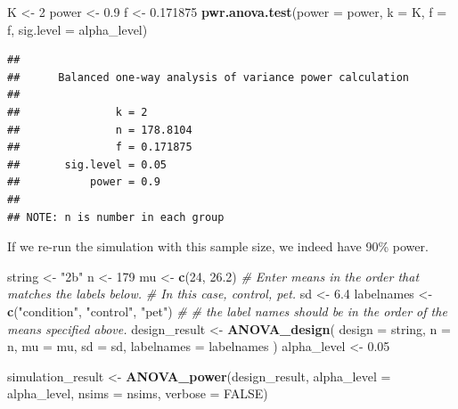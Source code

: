 \documentclass[
]{book}
\newenvironment{Shaded}{\begin{snugshade}}{\end{snugshade}}
\newcommand{\CommentTok}[1]{\textcolor[rgb]{0.56,0.35,0.01}{\textit{#1}}}
\newcommand{\DataTypeTok}[1]{\textcolor[rgb]{0.13,0.29,0.53}{#1}}
\newcommand{\DecValTok}[1]{\textcolor[rgb]{0.00,0.00,0.81}{#1}}
\newcommand{\FloatTok}[1]{\textcolor[rgb]{0.00,0.00,0.81}{#1}}
\newcommand{\KeywordTok}[1]{\textcolor[rgb]{0.13,0.29,0.53}{\textbf{#1}}}
\newcommand{\NormalTok}[1]{#1}
\newcommand{\OtherTok}[1]{\textcolor[rgb]{0.56,0.35,0.01}{#1}}
\newcommand{\StringTok}[1]{\textcolor[rgb]{0.31,0.60,0.02}{#1}}
\begin{document}
\begin{Shaded}
\begin{Highlighting}[]
\NormalTok{K <-}\StringTok{ }\DecValTok{2}
\NormalTok{power <-}\StringTok{ }\FloatTok{0.9}
\NormalTok{f <-}\StringTok{ }\FloatTok{0.171875}
\KeywordTok{pwr.anova.test}\NormalTok{(}\DataTypeTok{power =}\NormalTok{ power,}
               \DataTypeTok{k =}\NormalTok{ K,}
               \DataTypeTok{f =}\NormalTok{ f,}
               \DataTypeTok{sig.level =}\NormalTok{ alpha_level)}
\end{Highlighting}
\end{Shaded}

\begin{verbatim}
## 
##      Balanced one-way analysis of variance power calculation 
## 
##               k = 2
##               n = 178.8104
##               f = 0.171875
##       sig.level = 0.05
##           power = 0.9
## 
## NOTE: n is number in each group
\end{verbatim}

If we re-run the simulation with this sample size, we indeed have 90\% power.

\begin{Shaded}
\begin{Highlighting}[]
\NormalTok{string <-}\StringTok{ "2b"}
\NormalTok{n <-}\StringTok{ }\DecValTok{179}
\NormalTok{mu <-}\StringTok{ }\KeywordTok{c}\NormalTok{(}\DecValTok{24}\NormalTok{, }\FloatTok{26.2}\NormalTok{)}
\CommentTok{# Enter means in the order that matches the labels below.}
\CommentTok{# In this case, control, pet.}
\NormalTok{sd <-}\StringTok{ }\FloatTok{6.4}
\NormalTok{labelnames <-}\StringTok{ }\KeywordTok{c}\NormalTok{(}\StringTok{"condition"}\NormalTok{, }\StringTok{"control"}\NormalTok{, }\StringTok{"pet"}\NormalTok{) }\CommentTok{#}
\CommentTok{# the label names should be in the order of the means specified above.}
\NormalTok{design_result <-}\StringTok{ }\KeywordTok{ANOVA_design}\NormalTok{(}
\DataTypeTok{design =}\NormalTok{ string,}
\DataTypeTok{n =}\NormalTok{ n,}
\DataTypeTok{mu =}\NormalTok{ mu,}
\DataTypeTok{sd =}\NormalTok{ sd,}
\DataTypeTok{labelnames =}\NormalTok{ labelnames}
\NormalTok{)}
\NormalTok{alpha_level <-}\StringTok{ }\FloatTok{0.05}
\end{Highlighting}
\end{Shaded}

\begin{Shaded}
\begin{Highlighting}[]
\NormalTok{simulation_result <-}\StringTok{ }\KeywordTok{ANOVA_power}\NormalTok{(design_result, }
                                 \DataTypeTok{alpha_level =}\NormalTok{ alpha_level, }
                                 \DataTypeTok{nsims =}\NormalTok{ nsims,}
                                 \DataTypeTok{verbose =} \OtherTok{FALSE}\NormalTok{)}
\end{Highlighting}
\end{Shaded}
\end{document}
